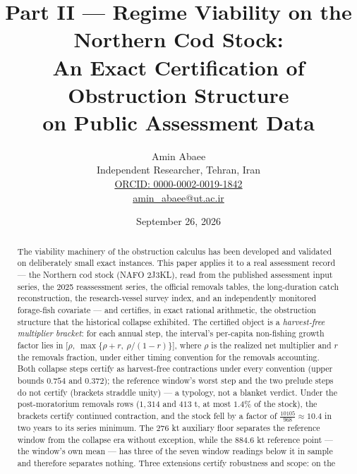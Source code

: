 \documentclass[10pt,twocolumn]{article}
\theoremstyle{plain}
\theoremstyle{remark}
\begin{document}
\title{Part II --- Regime Viability on the Northern Cod Stock:\\
An Exact Certification of Obstruction Structure\\
on Public Assessment Data}
\author{Amin Abaee\\[0.35em]
{\small Independent Researcher, Tehran, Iran}\\[0.55em]
{\small\href{https://orcid.org/0000-0002-0019-1842}{ORCID: 0000-0002-0019-1842}}\\[0.3em]
{\small\href{mailto:amin\_abaee@ut.ac.ir}{amin\_abaee@ut.ac.ir}}}
\date{September 26, 2026}
\maketitle

\begin{abstract}
The viability machinery of the obstruction calculus has been developed
and validated on deliberately small exact instances. This paper applies
it to a real assessment record --- the Northern cod stock (NAFO 2J3KL),
read from the published assessment input series, the 2025 reassessment
series, the official removals tables, the long-duration catch
reconstruction, the research-vessel survey index, and an independently
monitored forage-fish covariate --- and certifies, in exact rational
arithmetic, the obstruction structure that the historical collapse
exhibited. The certified object is a \emph{harvest-free multiplier
bracket}: for each annual step, the interval's per-capita non-fishing
growth factor lies in
\(\bigl[\rho,\ \max\{\rho+r,\ \rho/(1-r)\}\bigr]\), where \(\rho\) is
the realized net multiplier and \(r\) the removals fraction, under
either timing convention for the removals accounting. Both collapse
steps certify as harvest-free contractions under every convention
(upper bounds \(0.754\) and \(0.372\)); the reference window's worst
step and the two prelude steps do not certify (brackets straddle
unity) --- a typology, not a blanket verdict. Under the post-moratorium
removals rows (\(1{,}314\) and \(413\) t, at most \(1.4\%\) of the
stock), the brackets certify continued contraction, and the stock fell
by a factor of \(\tfrac{10105}{968} \approx 10.4\) in two years to its
series minimum. The \(276\) kt auxiliary floor separates the reference
window from the collapse era without exception, while the
\(884.6\) kt reference point --- the window's own mean --- has three of
the seven window readings below it in sample and therefore separates
nothing. Three extensions certify robustness and scope: on the

\end{abstract}
\end{document}
